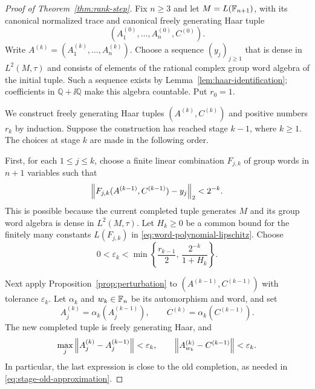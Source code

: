 \begin{proof}[Proof of Theorem~\ref{thm:rank-step}]
Fix $n\geq3$ and let $M=L(\mathbb F_{n+1})$, with its canonical normalized
trace and canonical freely generating Haar tuple
\[
 (A_1^{(0)},\ldots,A_n^{(0)},C^{(0)}).
\]
Write $A^{(k)}=(A_1^{(k)},\ldots,A_n^{(k)})$.  Choose a sequence
$(y_j)_{j\geq1}$ that is dense in $L^2(M,\tau)$ and consists of
elements of the rational complex group word algebra of the initial
tuple.  Such a sequence exists by
Lemma~\ref{lem:haar-identification}; coefficients in
$\mathbb{Q}+\ii\mathbb{Q}$ make this algebra countable.  Put $r_0=1$.

We construct freely generating Haar tuples $(A^{(k)},C^{(k)})$ and
positive numbers $r_k$ by induction.  Suppose the construction has
reached stage $k-1$, where $k\geq1$.  The choices at stage $k$ are
made in the following order.

First, for each $1\leq j\leq k$, choose a finite linear combination
$F_{j,k}$ of group words in $n+1$ variables such that
\begin{equation}
\label{eq:stage-old-approximation}
 \left\lVert 
 F_{j,k}(A^{(k-1)},C^{(k-1)})-y_j
 \right\rVert_2<2^{-k}.
\end{equation}
This is possible because the current completed tuple generates $M$
and its group word algebra is dense in $L^2(M,\tau)$.
Let $H_k\geq0$ be a common bound for the finitely many constants
$L(F_{j,k})$ in \eqref{eq:word-polynomial-lipschitz}.  Choose
\begin{equation}
\label{eq:stage-tolerance}
 0<\varepsilon_k<
 \min\left\{\frac{r_{k-1}}2,\,
                  \frac{2^{-k}}{1+H_k}\right\}.
\end{equation}

Next apply Proposition~\ref{prop:perturbation} to
$(A^{(k-1)},C^{(k-1)})$ with tolerance $\varepsilon_k$.
Let $\alpha_k$ and $w_k\in\mathbb F_n$ be its automorphism and word, and set
\[
 A_j^{(k)}=\alpha_k(A_j^{(k-1)}),
 \qquad
 C^{(k)}=\alpha_k(C^{(k-1)}).
\]
The new completed tuple is freely generating Haar, and
\begin{equation}
\label{eq:stage-perturbation}
 \max_j\left\lVert A_j^{(k)}-A_j^{(k-1)}\right\rVert<\varepsilon_k,
 \qquad
 \left\lVert A_{w_k}^{(k)}-C^{(k-1)}\right\rVert<\varepsilon_k.
\end{equation}
In particular, the last expression is close to the old completion,
as needed in \eqref{eq:stage-old-approximation}.


\end{proof}
